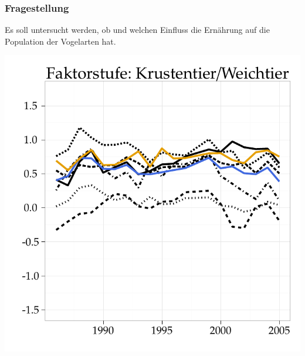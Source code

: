 \documentclass[xcolor=dvipsnames, compress, serif, professionalfont, handout]{beamer}
\newenvironment{knitrout}{}{} %
\renewenvironment{knitrout}{\begin{footnotesize}}{\end{footnotesize}}
\begin{document}
%
%

\begin{frame}[fragile]
\frametitle{Fragestellung}
  Es soll untersucht werden, ob und welchen Einfluss die Ern\"ahrung
  auf die Population der Vogelarten hat.


  \hspace{-0.1cm}   
  \begin{minipage}{0.48\textwidth}
\begin{knitrout}
\color{fgcolor}

{\centering \includegraphics[width=\linewidth,height=\linewidth]{figure/graphics-GR_Krustentier} 

}


\end{knitrout}

  \end{minipage}
  \hspace{0.1cm}
  \begin{minipage}{0.48\textwidth} 
\begin{knitrout}
\color{fgcolor}


\end{knitrout}
\end{minipage}
\end{frame}
\end{document}
